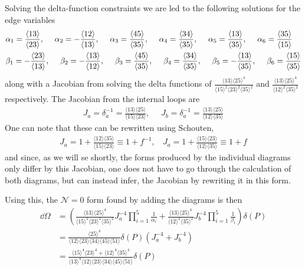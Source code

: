 \documentclass[letter,11pt]{article}
\newcommand{\ab}[1]{\langle #1 \rangle}
\begin{document}
Solving the delta-function constraints we are led to the following solutions for the edge variables
\begin{equation}
	\begin{aligned}
		&\alpha_1=\frac{\expval{13}}{\expval{23}},~~~~
		\alpha_2=-\frac{\expval{12}}{\expval{13}},~~~~
		\alpha_3=\frac{\expval{45}}{\expval{35}},~~~~
		\alpha_4=\frac{\expval{34}}{\expval{35}},~~~~
		\alpha_5=\frac{\expval{13}}{\expval{35}},~~~~
		\alpha_6=\frac{\expval{35}}{\expval{15}}\\
	&\beta_1=-\frac{\expval{23}}{\expval{13}},~~~~
	\beta_2=-\frac{\expval{13}}{\expval{12}},~~~~
	\beta_3=\frac{\expval{45}}{\expval{35}},~~~~
	\beta_4=\frac{\expval{34}}{\expval{35}},~~~~
	\beta_5=-\frac{\expval{13}}{\expval{35}},~~~~
	\beta_6=\frac{\expval{15}}{\expval{35}}
	\end{aligned}
\end{equation}
along with a Jacobian from solving the delta functions of $\frac{\ab{13}\ab{25}^4}{\ab{15}^2\ab{23}^2\ab{35}^2}$ and $\frac{\ab{13}\ab{25}^4}{\ab{12}^2\ab{35}^2}$ respectively. The Jacobian from the internal loops are
\begin{equation}
	\begin{aligned}
		J_a=\delta_a^{-1}=\frac{\ab{13}\ab{25}}{\ab{15}\ab{23}},~~~~~~J_b=\delta_a^{-1}=\frac{\ab{13}\ab{25}}{\ab{12}\ab{35}}
	\end{aligned}
\end{equation}
One can note that these can be rewritten using Schouten,
\begin{equation}
	\begin{aligned}
		J_a=1+\frac{\ab{12}\ab{35}}{\ab{15}\ab{23}}\equiv1+f^{-1},~~~~J_a=1+\frac{\ab{15}\ab{23}}{\ab{12}\ab{35}}\equiv1+f
	\end{aligned}
\end{equation}
and since, as we will se shortly, the forms produced by the individual diagrams only differ by this Jacobian, one does not have to go through the calculation of both diagrams, but can instead infer, the Jacobian by rewriting it in this form.

Using this, the $\mathcal{N}=0$ form found by adding the diagrams is then
\begin{equation}
	\begin{aligned}
		\dd\Omega
		&=\left(\frac{\ab{13}\ab{25}^4}{\ab{15}^2\ab{23}^2\ab{35}^2}J_a^{-4}\prod_{i=1}^{5}\frac{1}{\alpha_i}+\frac{\ab{13}\ab{25}^4}{\ab{12}^2\ab{35}^2}J_b^{-4}\prod_{i=1}^{5}\frac{1}{\beta_i}\right)\delta(P)\\
		&=\frac{\ab{25}^4}{\ab{12}\ab{23}\ab{34}\ab{45}\ab{51}}\delta(P)\left(J_a^{-4}+J_b^{-4}\right)\\
		&=\frac{\ab{15}^4\ab{23}^4+\ab{12}^4\ab{35}^4}{\ab{13}^4\ab{12}\ab{23}\ab{34}\ab{45}\ab{51}}\delta(P)
	\end{aligned}
\end{equation}
\end{document}
